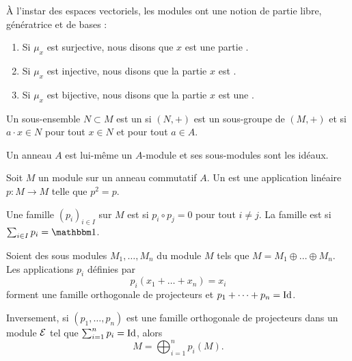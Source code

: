 \begin{definition}      \label{DefBasePouyKj}
    À l'instar des espaces vectoriels, les modules ont une notion de partie libre, génératrice et de bases :
    \begin{enumerate}
        \item
            Si \( \mu_x\) est surjective, nous disons que \( x\) est une partie .
        \item
            Si \( \mu_x\) est injective, nous disons que la partie \( x\) est .
        \item
            Si \( \mu_x\) est bijective, nous disons que la partie \( x\) est une .
    \end{enumerate}
\end{definition}

\begin{definition}
  Un sous-ensemble \( N\subset M\) est un  si \( (N,+)\) est un sous-groupe de \( (M,+)\) et si \( a\cdot x\in N\) pour tout \( x\in N\) et pour tout \( a\in A\).
\end{definition}

\begin{example}
    Un anneau \( A\) est lui-même un \( A\)-module et ses sous-modules sont les idéaux.
\end{example}

\begin{definition}
    Soit \( M\) un module sur un anneau commutatif \( A\). Un  est une application linéaire \( p\colon M\to M\) telle que \( p^2=p\).

    Une famille \( (p_i)_{i\in I}\) sur \( M\) est  si \( p_i\circ p_j=0\) pour tout \( i\neq j\). La famille est  si \( \sum_{i\in I}p_i=\mtu\).
\end{definition}

\begin{theorem}     \label{ThoProjModpAlsUR}
    Soient des sous modules \( M_1,\ldots,M_n\) du module \( M \) tels que \( M=M_1\oplus\ldots\oplus M_n\). Les applications \( p_i\) définies par
    \begin{equation}
        p_i(x_1+\ldots+x_n)=x_i
    \end{equation}
    forment une famille orthogonale de projecteurs et \( p_1+\cdots +p_n=\operatorname{Id}\).

    Inversement, si \( (p_1,\ldots, p_n)\) est une famille orthogonale de projecteurs dans un module \( \mathcal{E}\) tel que \( \sum_{i=1}^np_i=\operatorname{Id}\), alors
    \begin{equation}
        M=\bigoplus_{i=1}^np_i(M).
    \end{equation}
\end{theorem}

